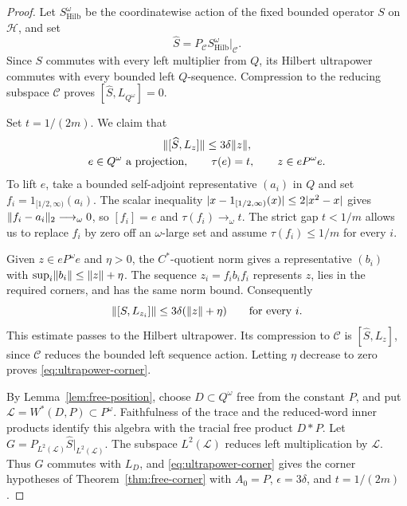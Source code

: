 \begin{proof}
Let \(S^{\omega}_{\mathrm{Hilb}}\) be the coordinatewise action of
the fixed bounded operator \(S\) on \(\mathcal H\), and set
\[
 \widehat S=P_{\mathcal C}S^{\omega}_{\mathrm{Hilb}}
                              \big|_{\mathcal C}.
\]
Since \(S\) commutes with every left multiplier from \(Q\), its
Hilbert ultrapower commutes with every bounded left \(Q\)-sequence.
Compression to the reducing subspace \(\mathcal C\) proves
\([\widehat S,L_{Q^\omega}]=0\).

Set \(t=1/(2m)\).  We claim that
\begin{equation}
 \label{eq:ultrapower-corner}
 \begin{gathered}
 \lVert[\widehat S,L_z]\rVert\leq3\delta\lVert z\rVert,\\
 e\in Q^\omega\text{ a projection},\qquad
       \tau(e)=t,\qquad z\in eP^\omega e.
 \end{gathered}
\end{equation}
To lift \(e\), take a bounded self-adjoint representative \((a_i)\)
in \(Q\) and set \(f_i=1_{[1/2,\infty)}(a_i)\).  The scalar inequality
\(\lvert x-1_{[1/2,\infty)}(x)\rvert\leq2\lvert x^2-x\rvert\) gives
\(\norm{f_i-a_i}_2\longrightarrow_\omega0\), so \([f_i]=e\) and
\(\tau(f_i)\longrightarrow_\omega t\).  The strict gap
\(t<1/m\) allows us to replace \(f_i\) by zero off an
\(\omega\)-large set and assume \(\tau(f_i)\leq1/m\) for every \(i\).

Given \(z\in eP^\omega e\) and \(\eta>0\), the \(C^*\)-quotient
norm gives a representative \((b_i)\) with
\(\sup_i\lVert b_i\rVert\leq\lVert z\rVert+\eta\).  The sequence
\(z_i=f_ib_if_i\) represents \(z\), lies in the required corners,
and has the same norm bound.  Consequently
\[
 \lVert[S,L_{z_i}]\rVert\leq3\delta(\lVert z\rVert+\eta)
 \qquad\text{for every }i.
\]
This estimate passes to the Hilbert ultrapower.  Its compression to
\(\mathcal C\) is \([\widehat S,L_z]\), since \(\mathcal C\) reduces
the bounded left sequence action.  Letting \(\eta\) decrease to zero
proves \eqref{eq:ultrapower-corner}.

By Lemma~\ref{lem:free-position}, choose \(D\subset Q^\omega\)
free from the constant \(P\), and put
\(\mathcal L=W^*(D,P)\subset P^\omega\).  Faithfulness of the trace
and the reduced-word inner products identify this algebra with the
tracial free product \(D*P\).  Let
\(G=P_{L^2(\mathcal L)}\widehat S|_{L^2(\mathcal L)}\).
The subspace \(L^2(\mathcal L)\) reduces left multiplication by
\(\mathcal L\).  Thus \(G\) commutes with \(L_D\), and
\eqref{eq:ultrapower-corner} gives the corner hypotheses of
Theorem~\ref{thm:free-corner} with
\(A_0=P\), \(\epsilon=3\delta\), and \(t=1/(2m)\).


\end{proof}
